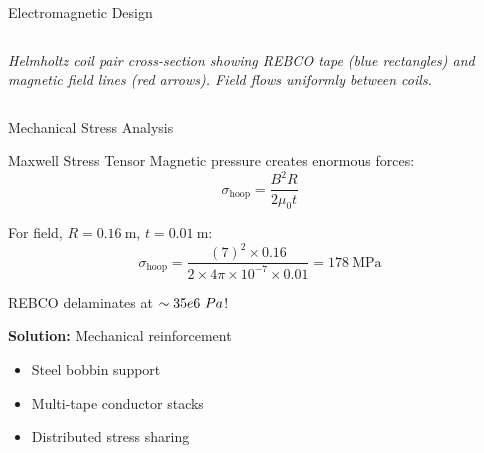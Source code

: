 \begin{frame}{Electromagnetic Design}
\begin{columns}
\begin{column}{0.5\textwidth}
            
            \vspace{0.2cm}
            \begin{center}
                \footnotesize
                \textit{Helmholtz coil pair cross-section showing REBCO tape (blue rectangles) and magnetic field lines (red arrows). Field flows uniformly between coils.}
            \end{center}
        \end{column}
    \end{columns}
\end{frame}

\begin{frame}{Mechanical Stress Analysis}
    \begin{block}{Maxwell Stress Tensor}
        Magnetic pressure creates enormous forces:
        \begin{equation}
            \sigma_{\text{hoop}} = \frac{B^2 R}{2 \mu_0 t}
        \end{equation}
        
        For  field, $R = 0.16~\text{m}$, $t = 0.01~\text{m}$:
        \begin{equation}
            \sigma_{\text{hoop}} = \frac{(7)^2 \times 0.16}{2 \times 4\pi \times 10^{-7} \times 0.01} = 178~\text{MPa}
        \end{equation}
    \end{block}
    
    \vspace{0.3cm}
     REBCO delaminates at $\sim35e6~Pa$!
    
    \textbf{Solution:} Mechanical reinforcement
    \begin{itemize}
        \item Steel bobbin support
        \item Multi-tape conductor stacks
        \item Distributed stress sharing
    \end{itemize}
\end{frame}

